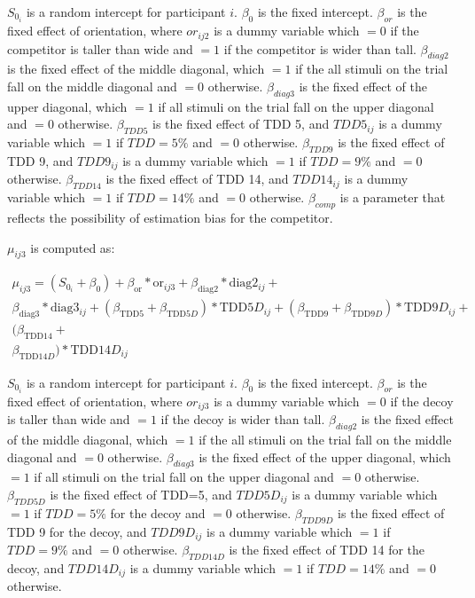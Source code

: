 $S_{0_i}$ is a random intercept for participant $i$. $\beta_{0}$ is the fixed intercept. $\beta_{or}$ is the fixed effect of orientation, where $or_{ij2}$ is a dummy variable which $=0$ if the competitor is taller than wide and $=1$ if the competitor is wider than tall. $\beta_{diag2}$ is the fixed effect of the middle diagonal, which $=1$ if the all stimuli on the trial fall on the middle diagonal and $=0$ otherwise. $\beta_{diag3}$ is the fixed effect of the upper diagonal, which $=1$ if all stimuli on the trial fall on the upper diagonal and $=0$ otherwise. $\beta_{TDD5}$ is the fixed effect of TDD 5, and $TDD5_{ij}$ is a dummy variable which $=1$ if $TDD=5\%$ and $=0$ otherwise. $\beta_{TDD9}$ is the fixed effect of TDD 9, and $TDD9_{ij}$ is a dummy variable which $=1$ if $TDD=9\%$ and $=0$ otherwise. $\beta_{TDD14}$ is the fixed effect of TDD 14, and $TDD14_{ij}$ is a dummy variable which $=1$ if $TDD=14\%$ and $=0$ otherwise. $\beta_{comp}$ is a parameter that reflects the possibility of estimation bias for the competitor.

$\mu_{ij3}$ is computed as:

\begin{equation}
    \begin{aligned}
        \mu_{ij3}=(S_{0_i} + \beta_{0}) + \beta_{\mathrm{or}}*\mathrm{or}_{ij3} + \beta_{\mathrm{diag}2}*\mathrm{diag}2_{ij}+ \\\beta_{\mathrm{diag}3}*\mathrm{diag}3_{ij} + (\beta_{\mathrm{TDD}5} + \beta_{\mathrm{TDD}5D})*\mathrm{TDD}5D_{ij} + (\beta_{\mathrm{TDD}9} + \beta_{\mathrm{TDD}9D})*\mathrm{TDD}9D_{ij} +\\ (\beta_{\mathrm{TDD}14} +\\ \beta_{\mathrm{TDD}14D})*\mathrm{TDD}14D_{ij}
        \label{circle_mu_eqn3}
    \end{aligned}
\end{equation}

$S_{0_i}$ is a random intercept for participant $i$. $\beta_{0}$ is the fixed intercept. $\beta_{or}$ is the fixed effect of orientation, where $or_{ij3}$ is a dummy variable which $=0$ if the decoy is taller than wide and $=1$ if the decoy is wider than tall. $\beta_{diag2}$ is the fixed effect of the middle diagonal, which $=1$ if the all stimuli on the trial fall on the middle diagonal and $=0$ otherwise. $\beta_{diag3}$ is the fixed effect of the upper diagonal, which $=1$ if all stimuli on the trial fall on the upper diagonal and $=0$ otherwise. $\beta_{TDD5D}$ is the fixed effect of TDD=5, and $TDD5D_{ij}$ is a dummy variable which $=1$ if $TDD=5\%$ for the decoy and $=0$ otherwise. $\beta_{TDD9D}$ is the fixed effect of TDD 9 for the decoy, and $TDD9D_{ij}$ is a dummy variable which $=1$ if $TDD=9\%$ and $=0$ otherwise. $\beta_{TDD14D}$ is the fixed effect of TDD 14 for the decoy, and $TDD14D_{ij}$ is a dummy variable which $=1$ if $TDD=14\%$ and $=0$ otherwise. 


